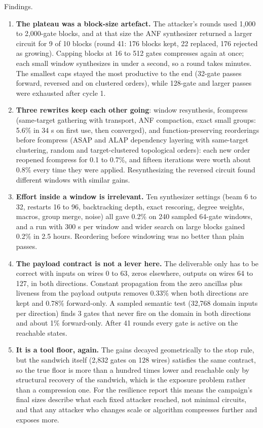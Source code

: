 \documentclass[11pt,a4paper]{article}
\begin{document}
Findings.
\begin{enumerate}
\item \textbf{The plateau was a block-size artefact.} The attacker's rounds used 1{,}000 to 2{,}000-gate blocks, and at that size the ANF synthesizer returned a larger circuit for 9 of 10 blocks (round 41: 176 blocks kept, 22 replaced, 176 rejected as growing). Capping blocks at 16 to 512 gates compresses again at once; each small window synthesizes in under a second, so a round takes minutes. The smallest caps stayed the most productive to the end (32-gate passes forward, reversed and on clustered orders), while 128-gate and larger passes were exhausted after cycle 1.
\item \textbf{Three rewrites keep each other going}: window resynthesis, fcompress (same-target gathering with transport, ANF compaction, exact small groups: 5.6\% in 34 s on first use, then converged), and function-preserving reorderings before fcompress (ASAP and ALAP dependency layering with same-target clustering, random and target-clustered topological orders): each new order reopened fcompress for 0.1 to 0.7\%, and fifteen iterations were worth about 0.8\% every time they were applied. Resynthesizing the reversed circuit found different windows with similar gains.
\item \textbf{Effort inside a window is irrelevant.} Ten synthesizer settings (beam 6 to 32, restarts 16 to 96, backtracking depth, exact rescoring, degree weights, macros, group merge, noise) all gave 0.2\% on 240 sampled 64-gate windows, and a run with 300 s per window and wider search on large blocks gained 0.2\% in 2.5 hours. Reordering before windowing was no better than plain passes.
\item \textbf{The payload contract is not a lever here.} The deliverable only has to be correct with inputs on wires 0 to 63, zeros elsewhere, outputs on wires 64 to 127, in both directions. Constant propagation from the zero ancillas plus liveness from the payload outputs removes 0.33\% when both directions are kept and 0.78\% forward-only. A sampled semantic test (32{,}768 domain inputs per direction) finds 3 gates that never fire on the domain in both directions and about 1\% forward-only. After 41 rounds every gate is active on the reachable states.
\item \textbf{It is a tool floor, again.} The gains decayed geometrically to the stop rule, but the sandwich itself (2{,}832 gates on 128 wires) satisfies the same contract, so the true floor is more than a hundred times lower and reachable only by structural recovery of the sandwich, which is the exposure problem rather than a compression one. For the resilience report this means the campaign's final sizes describe what each fixed attacker reached, not minimal circuits, and that any attacker who changes scale or algorithm compresses further and exposes more.
\end{enumerate}
\end{document}
